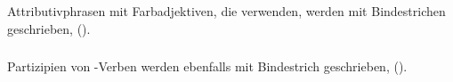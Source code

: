 \subsubsection{} Attributivphrasen mit Farbadjektiven, die   verwenden, werden mit Bindestrichen geschrieben,   ().

\subsubsection{} Partizipien von -Verben werden ebenfalls mit Bindestrich geschrieben,  
().